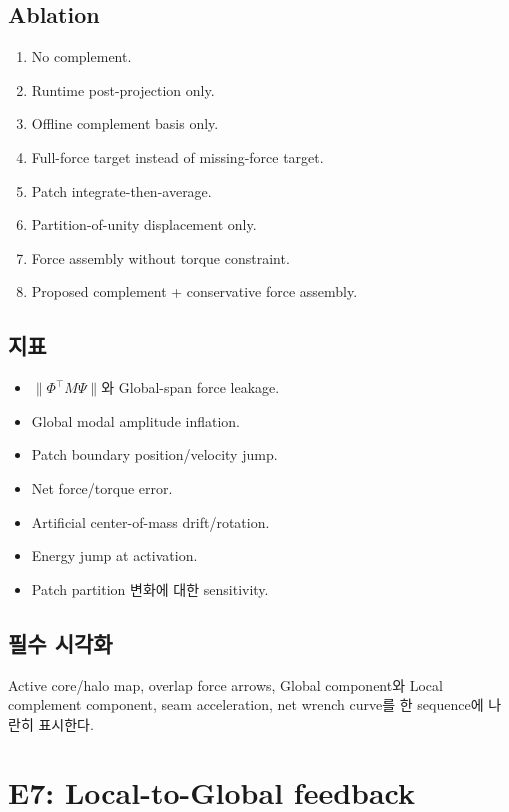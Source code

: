 \documentclass[11pt,a4paper]{article}
\begin{document}
\subsection*{Ablation}

\begin{enumerate}[leftmargin=1.7em]
  \item No complement.
  \item Runtime post-projection only.
  \item Offline complement basis only.
  \item Full-force target instead of missing-force target.
  \item Patch integrate-then-average.
  \item Partition-of-unity displacement only.
  \item Force assembly without torque constraint.
  \item Proposed complement + conservative force assembly.
\end{enumerate}

\subsection*{지표}

\begin{itemize}[leftmargin=1.5em]
  \item \(\|\Phi^\top M\Psi\|\)와 Global-span force leakage.
  \item Global modal amplitude inflation.
  \item Patch boundary position/velocity jump.
  \item Net force/torque error.
  \item Artificial center-of-mass drift/rotation.
  \item Energy jump at activation.
  \item Patch partition 변화에 대한 sensitivity.
\end{itemize}

\subsection*{필수 시각화}

Active core/halo map, overlap force arrows,
Global component와 Local complement component,
seam acceleration, net wrench curve를 한 sequence에 나란히 표시한다.

\section{E7: Local-to-Global feedback}
\end{document}
